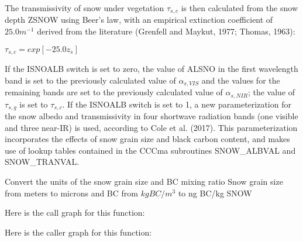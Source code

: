 The transmissivity of snow under vegetation $\tau_{s,c}$ is then calculated from the snow depth Z\+S\+N\+O\+W using Beer’s law, with an empirical extinction coefficient of $25.0 m^{-1}$ derived from the literature (Grenfell and Maykut, 1977; Thomas, 1963)\+:

$\tau_{s,c} = exp[-25.0 z_s]$

If the I\+S\+N\+O\+A\+L\+B switch is set to zero, the value of A\+L\+S\+N\+O in the first wavelength band is set to the previously calculated value of $\alpha_{s,VIS}$ and the values for the remaining bands are set to the previously calculated value of $\alpha_{s,NIR}$; the value of $\tau_{s,g}$ is set to $\tau_{s,c}$. If the I\+S\+N\+O\+A\+L\+B switch is set to 1, a new parameterization for the snow albedo and transmissivity in four shortwave radiation bands (one visible and three near-\/\+I\+R) is used, according to Cole et al. (2017). This parameterization incorporates the effects of snow grain size and black carbon content, and makes use of lookup tables contained in the C\+C\+Cma subroutines S\+N\+O\+W\+\_\+\+A\+L\+B\+V\+A\+L and S\+N\+O\+W\+\_\+\+T\+R\+A\+N\+V\+A\+L.

Convert the units of the snow grain size and B\+C mixing ratio Snow grain size from meters to microns and B\+C from $kg BC/m^3$ to ng B\+C/kg S\+N\+O\+W

Here is the call graph for this function\+:




Here is the caller graph for this function\+:


